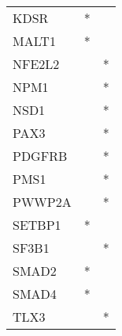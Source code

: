 \begin{tabular}{lcc}
KDSR     &              * &            \\
MALT1    &              * &            \\
NFE2L2   &                &          * \\
NPM1     &                &          * \\
NSD1     &                &          * \\
PAX3     &                &          * \\
PDGFRB   &                &          * \\
PMS1     &                &          * \\
PWWP2A   &                &          * \\
SETBP1   &              * &            \\
SF3B1    &                &          * \\
SMAD2    &              * &            \\
SMAD4    &              * &            \\
TLX3     &                &          * \\
\bottomrule
\end{tabular}
